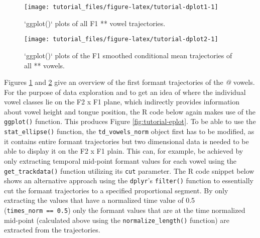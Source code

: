 \documentclass[
]{book}
\begin{document}
\begin{figure}

{\centering \texttt{[image: tutorial\_files/figure-latex/tutorial-dplot1-1]} 

}

\caption{`ggplot()` plots of all F1 *\@* vowel trajectories.}\label{fig:tutorial-dplot1}
\end{figure}

\begin{figure}

{\centering \texttt{[image: tutorial\_files/figure-latex/tutorial-dplot2-1]} 

}

\caption{`ggplot()` plots of the F1 smoothed conditional mean trajectories of all *\@* vowels.}\label{fig:tutorial-dplot2}
\end{figure}

Figures \ref{fig:tutorial-dplot1} and \ref{fig:tutorial-dplot2} give an overview of the first formant trajectories of the \emph{@} vowels. For the purpose of data exploration and to get an idea of where the individual vowel classes lie on the F2 x F1 plane, which indirectly provides information about vowel height and tongue position, the R code below again makes use of the \texttt{ggplot()} function. This produces Figure \ref{fig:tutorial-eplot}. To be able to use the \texttt{stat\_ellipse()} function, the \texttt{td\_vowels\_norm} object first has to be modified, as it contains entire formant trajectories but two dimensional data is needed to be able to display it on the F2 x F1 plain. This can, for example, be achieved by only extracting temporal mid-point formant values for each vowel using the \texttt{get\_trackdata()} function utilizing its \texttt{cut} parameter. The R code snippet below shows an alternative approach using the \texttt{dplyr}'s \texttt{filter()} function to essentially cut the formant trajectories to a specified proportional segment. By only extracting the values that have a normalized time value of 0.5 (\texttt{times\_norm\ ==\ 0.5}) only the formant values that are at the time normalized mid-point (calculated above using the \texttt{normalize\_length()} function) are extracted from the trajectories.
\end{document}

